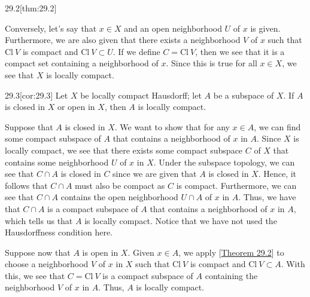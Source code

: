 \begin{thmBox}{29.2}[thm:29.2]
\begin{proofBox}
        \baseSkip 
        \wrapBox{\( \impliedby \)}

        Conversely, let's say that \( x \in X \) and an open neighborhood \( U \) of 
        \( x \) is given.
        Furthermore, we are also given that there exists a neighborhood \( V \) of 
        \( x \) such that \( \mathrm{Cl} \ V \) is compact and 
        \( \mathrm{Cl} \ V \subset U \).
        If we define \( C = \mathrm{Cl} \ V \), then we see that it is a compact 
        set containing a neighborhood of \( x \). 
        Since this is true for all \( x \in X \), we see that \( X \) is locally 
        compact. 
    \end{proofBox}
\end{thmBox}

\begin{thmBox}[Corollary]{29.3}[cor:29.3]
    Let \( X \) be locally compact Hausdorff; let \( A \) be a subspace of 
    \( X \). If \( A \) is closed in \( X \) or open in \( X \), then 
    \( A \) is locally compact.

    \baseRule

    \begin{proofBox}
        Suppose that \( A \) is closed in \( X \).
        We want to show that for any \( x \in A \), we can find some compact subspace 
        of \( A \) that contains a neighborhood of \( x \) in \( A \).
        Since \( X \) is locally compact, we see that there exists some compact
        subspace \( C \) of \( X \) that contains some neighborhood \( U \) of \( x \)
        in \( X \).
        Under the subspace topology, we can see that \( C \cap A \) is closed in \( C \)
        since we are given that \( A \) is closed in \( X \). 
        Hence, it follows that \( C \cap A \) must also be compact as \( C \) is 
        compact.
        Furthermore, we can see that \( C \cap A \) contains the open neighborhood
        \( U \cap A \) of \( x \) in \( A \).
        Thus, we have that \( C \cap A \) is a compact subspace of \( A \) that 
        contains a neighborhood of \( x \) in \( A \), which tells us that 
        \( A \) is locally compact. 
        Notice that we have not used the Hausdorffness condition here. 

        \baseSkip

        Suppose now that \( A \) is open in \( X \). 
        Given \( x \in A \), we apply [\hyperlink{thm:29.2}{Theorem 29.2}] to choose 
        a neighborhood \( V \) of \( x \) in \( X \) such that \( \mathrm{Cl} \ V \) is 
        compact and \( \mathrm{Cl} \ V \subset A \). 
        With this, we see that \( C = \mathrm{Cl} \ V \) is a compact subspace of
        \( A \) containing the neighborhood \( V \) of \( x \) in \( A \). 
        Thus, \( A \) is locally compact.
    \end{proofBox}
\end{thmBox}

